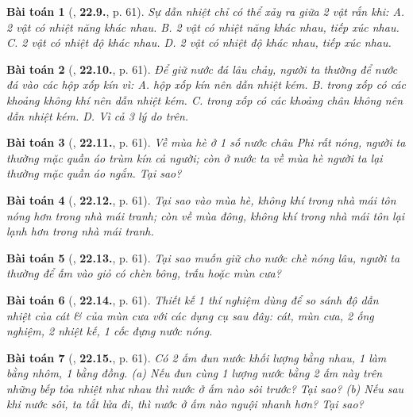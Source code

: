 \documentclass{article}
\numberwithin{equation}{section}
\newtheorem{baitoan}{Bài toán}
\begin{document}
\begin{baitoan}[\cite{SBT_Vat_Ly_8}, \textbf{22.9.}, p. 61]
	Sự dẫn nhiệt chỉ có thể xảy ra giữa 2 vật rắn khi: {\sf A.} 2 vật có nhiệt năng khác nhau. {\sf B.} 2 vật có nhiệt năng khác nhau, tiếp xúc nhau. {\sf C.} 2 vật có nhiệt độ khác nhau. {\sf D.} 2 vật có nhiệt độ khác nhau, tiếp xúc nhau.
\end{baitoan}

\begin{baitoan}[\cite{SBT_Vat_Ly_8}, \textbf{22.10.}, p. 61]
	Để giữ nước đá lâu chảy, người ta thường để nước đá vào các hộp xốp kín vì: {\sf A.} hộp xốp kín nên dẫn nhiệt kém. {\sf B.} trong xốp có các khoảng không khí nên dẫn nhiệt kém. {\sf C.} trong xốp có các khoảng chân không nên dẫn nhiệt kém. {\sf D.} Vì cả 3 lý do trên.
\end{baitoan}

\begin{baitoan}[\cite{SBT_Vat_Ly_8}, \textbf{22.11.}, p. 61]
	Về mùa hè ở 1 số nước châu Phi rất nóng, người ta thường mặc quần áo trùm kín cả người; còn ở nước ta về mùa hè người ta lại thường mặc quần áo ngắn. Tại sao?
\end{baitoan}

\begin{baitoan}[\cite{SBT_Vat_Ly_8}, \textbf{22.12.}, p. 61]
	Tại sao vào mùa hè, không khí trong nhà mái tôn nóng hơn trong nhà mái tranh; còn về mùa đông, không khí trong nhà mái tôn lại lạnh hơn trong nhà mái tranh.
\end{baitoan}

\begin{baitoan}[\cite{SBT_Vat_Ly_8}, \textbf{22.13.}, p. 61]
	Tại sao muốn giữ cho nước chè nóng lâu, người ta thường để ấm vào giỏ có chèn bông, trấu hoặc mùn cưa?
\end{baitoan}

\begin{baitoan}[\cite{SBT_Vat_Ly_8}, \textbf{22.14.}, p. 61]
	Thiết kế 1 thí nghiệm dùng để so sánh độ dẫn nhiệt của cát \& của mùn cưa với các dụng cụ sau đây: cát, mùn cưa, 2 ống nghiệm, 2 nhiệt kế, 1 cốc đựng nước nóng.
\end{baitoan}

\begin{baitoan}[\cite{SBT_Vat_Ly_8}, \textbf{22.15.}, p. 61]
	Có 2 ấm đun nước khối lượng bằng nhau, 1 làm bằng nhôm, 1 bằng đồng. (a) Nếu đun cùng 1 lượng nước bằng 2 ấm này trên những bếp tỏa nhiệt như nhau thì nước ở ấm nào sôi trước? Tại sao? (b) Nếu sau khi nước sôi, ta tắt lửa đi, thì nước ở ấm nào nguội nhanh hơn? Tại sao?
\end{baitoan}
\end{document}
